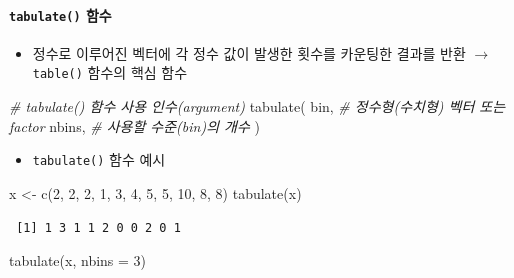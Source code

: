 \documentclass[
  11pt,
]{krantz}
\newenvironment{Shaded}{\begin{snugshade}}{\end{snugshade}}
\newcommand{\AttributeTok}[1]{\textcolor[rgb]{0.61,0.61,0.61}{#1}}
\newcommand{\CommentTok}[1]{\textcolor[rgb]{0.37,0.37,0.37}{\textit{#1}}}
\newcommand{\DecValTok}[1]{\textcolor[rgb]{0.06,0.06,0.06}{#1}}
\newcommand{\FunctionTok}[1]{\textcolor[rgb]{0,0,0}{#1}}
\newcommand{\NormalTok}[1]{#1}
\newcommand{\OtherTok}[1]{\textcolor[rgb]{0.37,0.37,0.37}{#1}}
\providecommand{\tightlist}{%
  \setlength{\itemsep}{0pt}\setlength{\parskip}{0pt}}
\begin{document}
\hypertarget{tab-fun1}{%
\paragraph*{\texorpdfstring{\texttt{tabulate()} 함수}{tabulate() 함수}}\label{tab-fun1}}

\begin{itemize}
\tightlist
\item
  정수로 이루어진 벡터에 각 정수 값이 발생한 횟수를 카운팅한 결과를 반환 \(\rightarrow\) \texttt{table()} 함수의 핵심 함수
\end{itemize}

\footnotesize

\begin{Shaded}
\begin{Highlighting}[]
\CommentTok{\# tabulate() 함수 사용 인수(argument)}
\FunctionTok{tabulate}\NormalTok{(}
\NormalTok{  bin,  }\CommentTok{\# 정수형(수치형) 벡터 또는 factor }
\NormalTok{  nbins, }\CommentTok{\# 사용할 수준(bin)의 개수 }
\NormalTok{)}
\end{Highlighting}
\end{Shaded}

\normalsize

\begin{itemize}
\tightlist
\item
  \texttt{tabulate()} 함수 예시
\end{itemize}

\footnotesize

\begin{Shaded}
\begin{Highlighting}[]
\NormalTok{x }\OtherTok{\textless{}{-}} \FunctionTok{c}\NormalTok{(}\DecValTok{2}\NormalTok{, }\DecValTok{2}\NormalTok{, }\DecValTok{2}\NormalTok{, }\DecValTok{1}\NormalTok{, }\DecValTok{3}\NormalTok{, }\DecValTok{4}\NormalTok{, }\DecValTok{5}\NormalTok{, }\DecValTok{5}\NormalTok{, }\DecValTok{10}\NormalTok{, }\DecValTok{8}\NormalTok{, }\DecValTok{8}\NormalTok{)}
\FunctionTok{tabulate}\NormalTok{(x)}
\end{Highlighting}
\end{Shaded}

\begin{verbatim}
 [1] 1 3 1 1 2 0 0 2 0 1
\end{verbatim}

\begin{Shaded}
\begin{Highlighting}[]
\FunctionTok{tabulate}\NormalTok{(x, }\AttributeTok{nbins =} \DecValTok{3}\NormalTok{)}
\end{Highlighting}
\end{Shaded}
\end{document}
